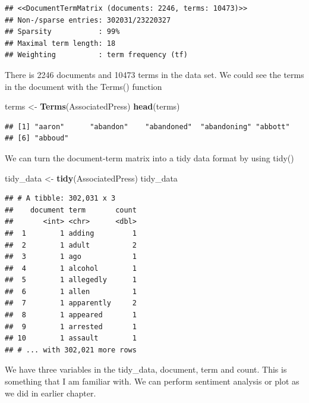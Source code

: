 \documentclass[]{article}
\newenvironment{Shaded}{\begin{snugshade}}{\end{snugshade}}
\newcommand{\DataTypeTok}[1]{\textcolor[rgb]{0.13,0.29,0.53}{#1}}
\newcommand{\KeywordTok}[1]{\textcolor[rgb]{0.13,0.29,0.53}{\textbf{#1}}}
\newcommand{\NormalTok}[1]{#1}
\newcommand{\OperatorTok}[1]{\textcolor[rgb]{0.81,0.36,0.00}{\textbf{#1}}}
\newcommand{\StringTok}[1]{\textcolor[rgb]{0.31,0.60,0.02}{#1}}
\begin{document}
\begin{verbatim}
## <<DocumentTermMatrix (documents: 2246, terms: 10473)>>
## Non-/sparse entries: 302031/23220327
## Sparsity           : 99%
## Maximal term length: 18
## Weighting          : term frequency (tf)
\end{verbatim}

There is 2246 documents and 10473 terms in the data set. We could see
the terms in the document with the Terms() function

\begin{Shaded}
\begin{Highlighting}[]
\NormalTok{terms <-}\StringTok{ }\KeywordTok{Terms}\NormalTok{(AssociatedPress)}
\KeywordTok{head}\NormalTok{(terms)}
\end{Highlighting}
\end{Shaded}

\begin{verbatim}
## [1] "aaron"      "abandon"    "abandoned"  "abandoning" "abbott"    
## [6] "abboud"
\end{verbatim}

We can turn the document-term matrix into a tidy data format by using
tidy()

\begin{Shaded}
\begin{Highlighting}[]
\NormalTok{tidy_data <-}\StringTok{ }\KeywordTok{tidy}\NormalTok{(AssociatedPress)}
\NormalTok{tidy_data}
\end{Highlighting}
\end{Shaded}

\begin{verbatim}
## # A tibble: 302,031 x 3
##    document term       count
##       <int> <chr>      <dbl>
##  1        1 adding         1
##  2        1 adult          2
##  3        1 ago            1
##  4        1 alcohol        1
##  5        1 allegedly      1
##  6        1 allen          1
##  7        1 apparently     2
##  8        1 appeared       1
##  9        1 arrested       1
## 10        1 assault        1
## # ... with 302,021 more rows
\end{verbatim}

We have three variables in the tidy\_data, document, term and count.
This is something that I am familiar with. We can perform sentiment
analysis or plot as we did in earlier chapter.

\begin{Shaded}
\end{Shaded}
\end{document}
